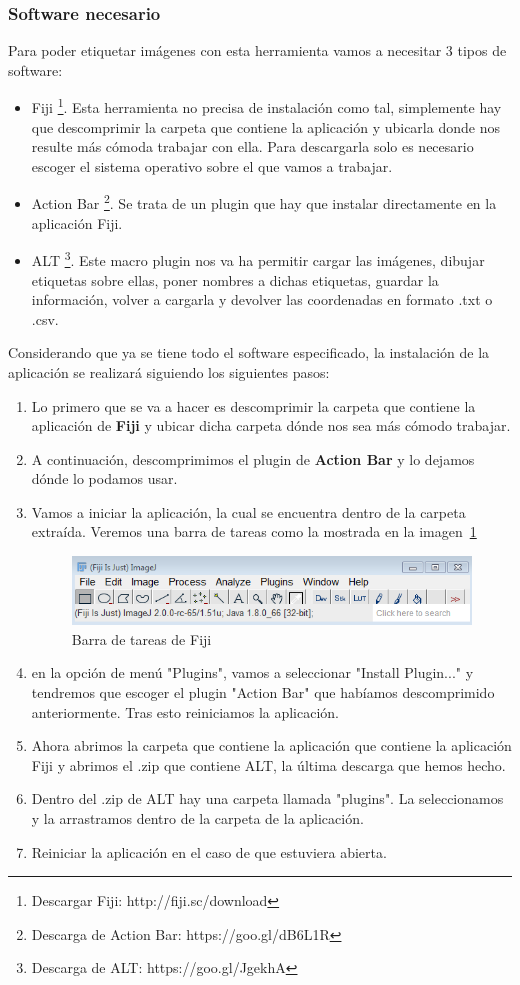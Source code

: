 \subsubsection{Software necesario}
Para poder etiquetar imágenes con esta herramienta vamos a necesitar 3 tipos de software:
\begin{itemize}
	\item Fiji \footnote{Descargar Fiji: http://fiji.sc/download}. Esta herramienta no precisa de instalación como tal, simplemente hay que descomprimir la carpeta que contiene la aplicación y ubicarla donde nos resulte más cómoda trabajar con ella.
	Para descargarla solo es necesario escoger el sistema operativo sobre el que vamos a trabajar.
	\item Action Bar \footnote{Descarga de Action Bar: https://goo.gl/dB6L1R}. Se trata de un plugin que hay que instalar directamente en la aplicación Fiji.
	\item ALT \footnote{Descarga de ALT: https://goo.gl/JgekhA}. Este macro plugin nos va ha permitir cargar las imágenes, dibujar etiquetas sobre ellas, poner nombres a dichas etiquetas, guardar la información, volver a cargarla y devolver las coordenadas en formato .txt o .csv.
\end{itemize}
Considerando que ya se tiene todo el software especificado,
la instalación de la aplicación se realizará siguiendo los siguientes pasos:
\begin{enumerate}
	\item Lo primero que se va a hacer es descomprimir la carpeta que contiene la aplicación de \textbf{Fiji} y ubicar dicha carpeta dónde nos sea más cómodo trabajar.
	\item A continuación, descomprimimos el plugin de \textbf{Action Bar} y lo dejamos dónde lo podamos usar.
	\item Vamos a iniciar la aplicación, la cual se encuentra dentro de la carpeta extraída. Veremos una barra de tareas como la mostrada en la imagen~\ref{fig:barra_de_tareas}
	\begin{figure}
		\centering
		\includegraphics[width=0.7\linewidth]{img/barra}
		\caption{Barra de tareas de Fiji}
		\label{fig:barra_de_tareas}
	\end{figure}
	
	\item en la opción de menú "Plugins", vamos a seleccionar "Install Plugin..."	y tendremos que escoger el plugin "Action Bar" que habíamos descomprimido anteriormente. Tras esto reiniciamos la aplicación.
	\item Ahora abrimos la carpeta que contiene la aplicación que contiene la aplicación Fiji y abrimos el .zip que contiene ALT, la última descarga que hemos hecho. 
	\item Dentro del .zip de ALT hay una carpeta llamada "plugins". La seleccionamos y la arrastramos dentro de la carpeta de la aplicación.
	\item Reiniciar la aplicación en el caso de que estuviera abierta.
\end{enumerate}
